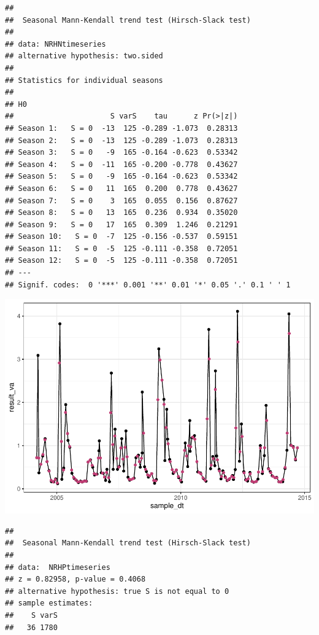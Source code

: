 \documentclass[12pt,]{article}
\begin{document}
\begin{verbatim}
## 
##  Seasonal Mann-Kendall trend test (Hirsch-Slack test)
## 
## data: NRHNtimeseries
## alternative hypothesis: two.sided
## 
## Statistics for individual seasons
## 
## H0
##                      S varS    tau      z Pr(>|z|)  
## Season 1:   S = 0  -13  125 -0.289 -1.073  0.28313  
## Season 2:   S = 0  -13  125 -0.289 -1.073  0.28313  
## Season 3:   S = 0   -9  165 -0.164 -0.623  0.53342  
## Season 4:   S = 0  -11  165 -0.200 -0.778  0.43627  
## Season 5:   S = 0   -9  165 -0.164 -0.623  0.53342  
## Season 6:   S = 0   11  165  0.200  0.778  0.43627  
## Season 7:   S = 0    3  165  0.055  0.156  0.87627  
## Season 8:   S = 0   13  165  0.236  0.934  0.35020  
## Season 9:   S = 0   17  165  0.309  1.246  0.21291  
## Season 10:   S = 0  -7  125 -0.156 -0.537  0.59151  
## Season 11:   S = 0  -5  125 -0.111 -0.358  0.72051  
## Season 12:   S = 0  -5  125 -0.111 -0.358  0.72051  
## ---
## Signif. codes:  0 '***' 0.001 '**' 0.01 '*' 0.05 '.' 0.1 ' ' 1
\end{verbatim}

\includegraphics{Project_Template_files/figure-latex/unnamed-chunk-6-9.pdf}

\begin{verbatim}
## 
##  Seasonal Mann-Kendall trend test (Hirsch-Slack test)
## 
## data:  NRHPtimeseries
## z = 0.82958, p-value = 0.4068
## alternative hypothesis: true S is not equal to 0
## sample estimates:
##    S varS 
##   36 1780
\end{verbatim}
\end{document}
